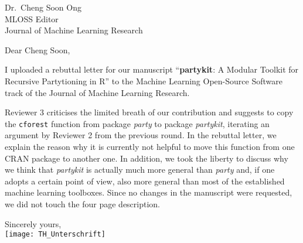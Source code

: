 \documentclass[ngerman,uzh]{scrlttr2}
\begin{document}

\begin{letter}{
Dr.~Cheng Soon Ong \\
MLOSS Editor \\
Journal of Machine Learning Research}

\subject{JMLR-14-133-3 revision}

\opening{Dear Cheng Soon,}

I uploaded a rebuttal letter for our manuscript
``\textbf{partykit}: A Modular Toolkit for Recursive Partytioning in R'' to the
Machine Learning Open-Source Software track of the Journal of Machine
Learning Research.

Reviewer 3 criticises the limited breath of our contribution and suggests to
copy the \texttt{cforest} function from package \emph{party} to package
\emph{partykit}, iterating an argument by Reviewer 2 from the previous
round. In the rebuttal letter, we explain the reason why it is currently not
helpful to move this function from one CRAN package to another one. In
addition, we took the liberty to discuss why we think that \emph{partykit}
is actually much more general than \emph{party} and, if one adopts a certain
point of view, also more general than most of the established machine
learning toolboxes. Since no changes in the manuscript were requested, we
did not touch the four page description.

Sincerely yours, \\
\texttt{[image: TH\_Unterschrift]}

\end{letter}
\end{document}
